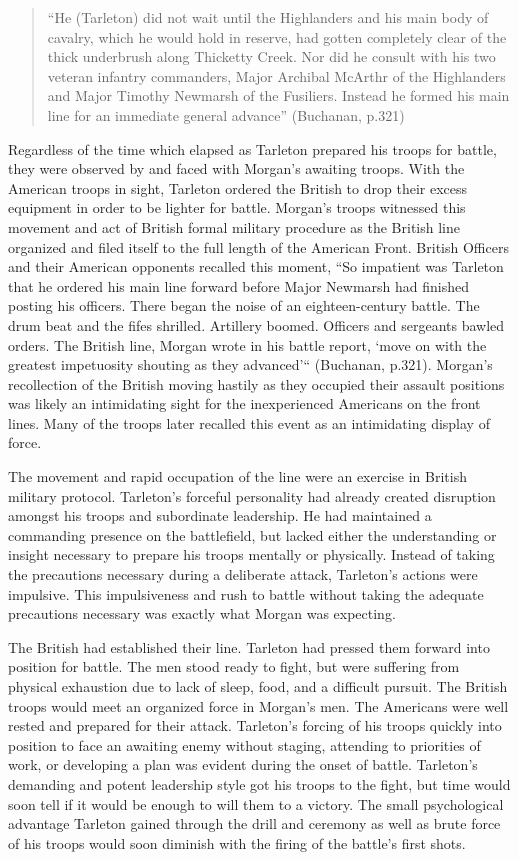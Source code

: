 \begin{quote}
  “He (Tarleton) did not wait until the Highlanders and his main body of
  cavalry, which he would hold in reserve, had gotten completely clear of the
  thick underbrush along Thicketty Creek.  Nor did he consult with his two
  veteran infantry commanders, Major Archibal McArthr of the Highlanders and
  Major Timothy Newmarsh of the Fusiliers.  Instead he formed his main line for
  an immediate general advance” (Buchanan, p.321)
\end{quote}


Regardless of the time which elapsed as Tarleton prepared his troops for battle,
they were observed by and faced with Morgan’s awaiting troops.  With the
American troops in sight, Tarleton ordered the British to drop their excess
equipment in order to be lighter for battle.  Morgan’s troops witnessed this
movement and act of British formal military procedure as the British line
organized and filed itself to the full length of the American Front.  British
Officers and their American opponents recalled this moment, “So impatient was
Tarleton that he ordered his main line forward before Major Newmarsh had
finished posting his officers.  There began the noise of an eighteen-century
battle.  The drum beat and the fifes shrilled.  Artillery boomed.  Officers and
sergeants bawled orders.  The British line, Morgan wrote in his battle report,
‘move on with the greatest impetuosity shouting as they advanced’“ (Buchanan,
p.321).   Morgan’s recollection of the British moving hastily as they occupied
their assault positions was likely an intimidating sight for the inexperienced
Americans on the front lines.   Many of the troops later recalled this event as
an intimidating display of force.

The movement and rapid occupation of the line were an exercise in British
military protocol.  Tarleton's forceful personality had already created
disruption amongst his troops and subordinate leadership.  He had maintained a
commanding presence on the battlefield, but lacked either the understanding or
insight necessary to prepare his troops mentally or physically.  Instead of
taking the precautions necessary during a deliberate attack, Tarleton's actions
were impulsive.  This impulsiveness and rush to battle without taking the
adequate precautions necessary was exactly what Morgan was expecting.


The British had established their line.  Tarleton had pressed them forward into
position for battle.  The men stood ready to fight, but were suffering from
physical exhaustion due to lack of sleep, food, and a difficult pursuit.  The
British troops would meet an organized force in Morgan’s men.  The Americans
were well rested and prepared for their attack.  Tarleton’s forcing of his
troops quickly into position to face an awaiting enemy without staging,
attending to priorities of work, or developing a plan was evident during the
onset of battle.  Tarleton’s demanding and potent leadership style got his
troops to the fight, but time would soon tell if it would be enough to will them
to a victory.  The small psychological advantage Tarleton gained through the
drill and ceremony as well as brute force of his troops would soon diminish with
the firing of the battle's first shots.

